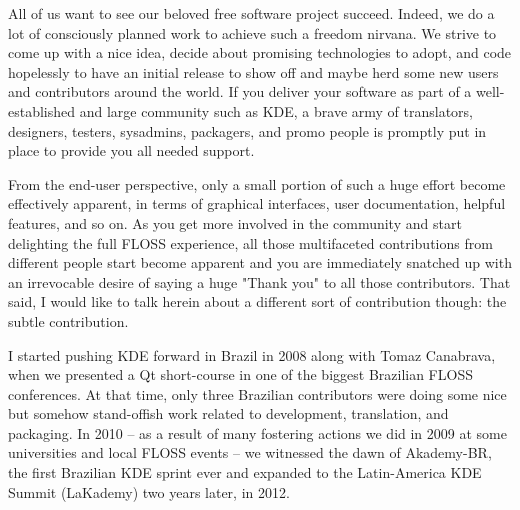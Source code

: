 

\noindent{}All of us want to see our beloved free software project succeed. Indeed, we do a lot of consciously planned work to achieve such a freedom nirvana. We strive to come up with a nice idea, decide about promising technologies to adopt, and code hopelessly to have an initial release to show off and maybe herd some new users and contributors around the world. If you deliver your software as part of a well-established and large community such as KDE, a brave army of translators, designers, testers, sysadmins, packagers, and promo people is promptly put in place to provide you all needed support.

From the end-user perspective, only a small portion of such a huge effort become effectively apparent, in terms of graphical interfaces, user documentation, helpful features, and so on. As you get more involved in the community and start delighting the full FLOSS experience, all those multifaceted contributions from different people start become apparent and you are immediately snatched up with an irrevocable desire of saying a huge "Thank you" to all those contributors. That said, I would like to talk herein about a different sort of contribution though: the subtle contribution.

I started pushing KDE forward in Brazil in 2008 along with Tomaz Canabrava, when we presented a Qt short-course in one of the biggest Brazilian FLOSS conferences. At that time, only three Brazilian contributors were doing some nice but somehow stand-offish work related to development, translation, and packaging. In 2010 -- as a result of many fostering actions we did in 2009 at some universities and local FLOSS events -- we witnessed the dawn of Akademy-BR, the first Brazilian KDE sprint ever and expanded to the Latin-America KDE Summit (LaKademy) two years later, in 2012.

